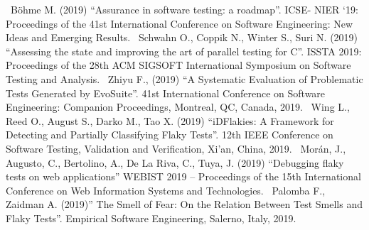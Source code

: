 \newline~\newline
[S25] Böhme M. (2019) “Assurance in software testing: a roadmap”. ICSE- NIER ‘19: Proceedings of the 41st International Conference on Software Engineering: New Ideas and Emerging Results.
\newline~\newline
[S26] Schwahn O., Coppik N., Winter S., Suri N. (2019) “Assessing the
state and improving the art of parallel testing for C”. ISSTA 2019: Proceedings of the 28th ACM SIGSOFT International Symposium on Software Testing and Analysis.
\newline~\newline
[S27] Zhiyu F., (2019) “A Systematic Evaluation of Problematic Tests
Generated by EvoSuite”. 41st International Conference on Software Engineering: Companion Proceedings, Montreal, QC, Canada, 2019.
\newline~\newline
[S28] Wing L., Reed O., August S., Darko M., Tao X. (2019) “iDFlakies: A Framework for Detecting and Partially Classifying Flaky Tests”. 12th IEEE Conference on Software Testing, Validation and Verification, Xi’an, China, 2019.
\newline~\newline
[S29] Morán, J., Augusto, C., Bertolino, A., De La Riva, C., Tuya, J.
(2019) “Debugging flaky tests on web applications” WEBIST 2019 – Proceedings of the 15th International Conference on Web Information Systems and Technologies.
\newline~\newline
[S30] Palomba F., Zaidman A. (2019)” The Smell of Fear: On the Relation Between Test Smells and Flaky Tests”. Empirical Software Engineering, Salerno, Italy, 2019.